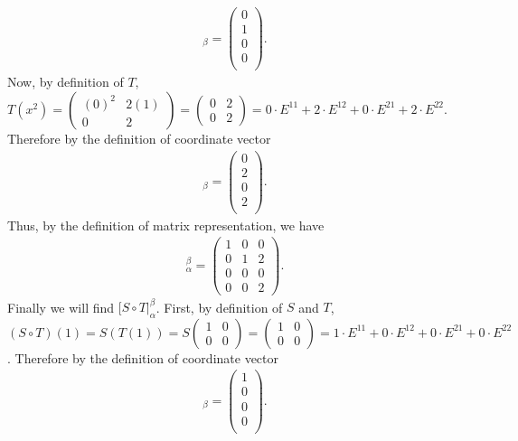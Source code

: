 \documentclass[12pt,answers]{exam}
\begin{document}
\begin{solution}
\begin{enumerate}[label=\roman*)]
\begin{align*}
    [T(x)]_{\beta}=\begin{pmatrix} 0 \\ 1 \\ 0 \\ 0 \\ \end{pmatrix}.
\end{align*}
Now, by definition of $T$, $T(x^2)=\begin{pmatrix} (0)^2 & 2(1) \\ 0 & 2 \end{pmatrix}=\begin{pmatrix} 0 & 2 \\ 0 & 2 \end{pmatrix}=0\cdot E^{11}+2\cdot E^{12}+0\cdot E^{21}+2\cdot E^{22}$. Therefore by the definition of coordinate vector
\begin{align*}
    [T(x^2)]_{\beta}=\begin{pmatrix} 0 \\ 2 \\ 0 \\ 2 \\ \end{pmatrix}.
\end{align*}
Thus, by the definition of matrix representation, we have
\begin{align*}
    [T]^{\beta}_{\alpha}=\begin{pmatrix} 1 & 0 & 0 \\
                                         0 & 1 & 2 \\
                                         0 & 0 & 0 \\
                                         0 & 0 & 2 \end{pmatrix}.
\end{align*} 
Finally we will find $[S\circ T|^{\beta}_{\alpha}$. First, by definition of $S$ and $T$,  $(S\circ T)(1)=S(T(1))=S\begin{pmatrix} 1 & 0 \\ 0 & 0 \end{pmatrix}=\begin{pmatrix} 1 & 0 \\ 0 & 0 \end{pmatrix}=1\cdot E^{11}+0\cdot E^{12}+0\cdot E^{21}+0\cdot E^{22}$. Therefore by the definition of coordinate vector
\begin{align*}
    [(S\circ T)(1)]_{\beta}=\begin{pmatrix} 1 \\ 0 \\ 0 \\ 0 \\ \end{pmatrix}.

\end{align*}
\end{enumerate}
\end{solution}
\end{document}
